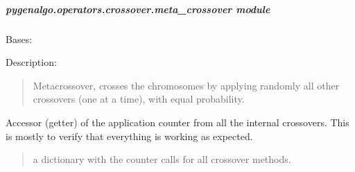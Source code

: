 \documentclass[letterpaper,10pt,english]{sphinxmanual}
\begin{document}
\subparagraph{pygenalgo.operators.crossover.meta\_crossover module}
\label{\detokenize{pygenalgo.operators.crossover:module-pygenalgo.operators.crossover.meta_crossover}}\label{\detokenize{pygenalgo.operators.crossover:pygenalgo-operators-crossover-meta-crossover-module}}

\begin{fulllineitems}
\label{\detokenize{pygenalgo.operators.crossover:pygenalgo.operators.crossover.meta_crossover.MetaCrossover}}
\pysigstartsignatures
{}
\pysigstopsignatures
\sphinxAtStartPar
Bases: {\hyperref[\detokenize{pygenalgo.operators.crossover:pygenalgo.operators.crossover.crossover_operator.CrossoverOperator}]{}}

\sphinxAtStartPar
Description:
\begin{quote}

\sphinxAtStartPar
Meta\sphinxhyphen{}crossover, crosses the chromosomes by applying randomly
all other crossovers (one at a time), with equal probability.
\end{quote}

\begin{fulllineitems}
\label{\detokenize{pygenalgo.operators.crossover:pygenalgo.operators.crossover.meta_crossover.MetaCrossover.all_counters}}
\pysigstartsignatures
{}
\pysigstopsignatures
\sphinxAtStartPar
Accessor (getter) of the application counter from all the internal crossovers.
This is mostly to verify that everything is working as expected.
\begin{quote}\begin{description}
\sphinxAtStartPar
a dictionary with the counter calls for all crossover methods.


\end{description}
\end{quote}
\end{fulllineitems}
\end{fulllineitems}
\end{document}
